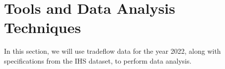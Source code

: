 \chapter{Tools and Data Analysis Techniques}

In this section, we will use tradeflow data for the year 2022, along with specifications from the IHS dataset, to perform data analysis.




